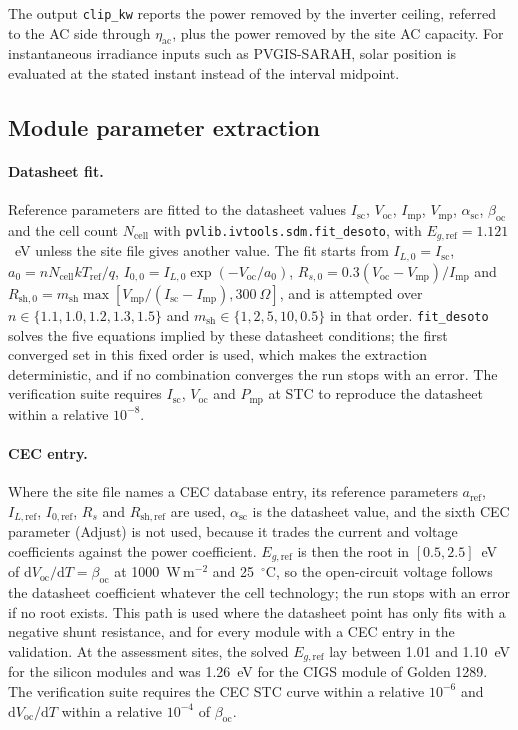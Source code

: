 \documentclass[11pt]{article}
\begin{document}
The output \texttt{clip\_kw} reports the power removed by the inverter ceiling, referred to the AC side through $\eta_{\mathrm{ac}}$, plus the power removed by the site AC capacity. For instantaneous irradiance inputs such as PVGIS-SARAH, solar position is evaluated at the stated instant instead of the interval midpoint.

\subsection{Module parameter extraction}
\label{sec:s_fit}

\paragraph{Datasheet fit.} Reference parameters are fitted to the datasheet values $I_{\mathrm{sc}}$, $V_{\mathrm{oc}}$, $I_{\mathrm{mp}}$, $V_{\mathrm{mp}}$, $\alpha_{\mathrm{sc}}$, $\beta_{\mathrm{oc}}$ and the cell count $N_{\mathrm{cell}}$ with \texttt{pvlib.ivtools.sdm.fit\_desoto}, with $E_{g,\mathrm{ref}}=1.121$~eV unless the site file gives another value. The fit starts from $I_{L,0}=I_{\mathrm{sc}}$, $a_0=nN_{\mathrm{cell}}kT_{\mathrm{ref}}/q$, $I_{0,0}=I_{L,0}\exp(-V_{\mathrm{oc}}/a_0)$, $R_{s,0}=0.3(V_{\mathrm{oc}}-V_{\mathrm{mp}})/I_{\mathrm{mp}}$ and $R_{\mathrm{sh},0}=m_{\mathrm{sh}}\max[V_{\mathrm{mp}}/(I_{\mathrm{sc}}-I_{\mathrm{mp}}),300~\Omega]$, and is attempted over $n\in\{1.1,1.0,1.2,1.3,1.5\}$ and $m_{\mathrm{sh}}\in\{1,2,5,10,0.5\}$ in that order. \texttt{fit\_desoto} solves the five equations implied by these datasheet conditions; the first converged set in this fixed order is used, which makes the extraction deterministic, and if no combination converges the run stops with an error. The verification suite requires $I_{\mathrm{sc}}$, $V_{\mathrm{oc}}$ and $P_{\mathrm{mp}}$ at STC to reproduce the datasheet within a relative $10^{-8}$.

\paragraph{CEC entry.} Where the site file names a CEC database entry, its reference parameters $a_{\mathrm{ref}}$, $I_{L,\mathrm{ref}}$, $I_{0,\mathrm{ref}}$, $R_s$ and $R_{\mathrm{sh,ref}}$ are used, $\alpha_{\mathrm{sc}}$ is the datasheet value, and the sixth CEC parameter (Adjust) is not used, because it trades the current and voltage coefficients against the power coefficient. $E_{g,\mathrm{ref}}$ is then the root in $[0.5,2.5]$~eV of $\mathrm{d}V_{\mathrm{oc}}/\mathrm{d}T=\beta_{\mathrm{oc}}$ at 1000~W\,m$^{-2}$ and 25~$^{\circ}$C, so the open-circuit voltage follows the datasheet coefficient whatever the cell technology; the run stops with an error if no root exists. This path is used where the datasheet point has only fits with a negative shunt resistance, and for every module with a CEC entry in the validation. At the assessment sites, the solved $E_{g,\mathrm{ref}}$ lay between 1.01 and 1.10~eV for the silicon modules and was 1.26~eV for the CIGS module of Golden 1289. The verification suite requires the CEC STC curve within a relative $10^{-6}$ and $\mathrm{d}V_{\mathrm{oc}}/\mathrm{d}T$ within a relative $10^{-4}$ of $\beta_{\mathrm{oc}}$.
\end{document}
